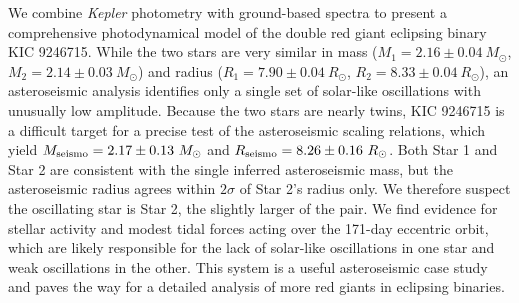 We combine \emph{Kepler} photometry with ground-based spectra to present a comprehensive photodynamical model of the double red giant eclipsing binary KIC 9246715. While the two stars are very similar in mass ($M_1 = 2.16 \pm 0.04\ M_{\odot}$, $M_2 = 2.14 \pm 0.03\ M_{\odot}$) and radius ($R_1 = 7.90 \pm 0.04 \ R_{\odot}$, $R_2 = 8.33 \pm 0.04 \ R_{\odot}$), an asteroseismic analysis identifies only a single set of solar-like oscillations with unusually low amplitude. Because the two stars are nearly twins, KIC 9246715 is a difficult target for a precise test of the asteroseismic scaling relations, which yield $M_{\rm{seismo}} = 2.17 \pm 0.13 \ M_{\odot}$ and $R_{\rm{seismo}} = 8.26 \pm 0.16 \ R_{\odot}$. Both Star 1 and Star 2 are consistent with the single inferred asteroseismic mass, but the asteroseismic radius agrees within $2 \sigma$ of Star 2's radius only. We therefore suspect the oscillating star is Star 2, the slightly larger of the pair. We find evidence for stellar activity and modest tidal forces acting over the 171-day eccentric orbit, which are likely responsible for the lack of solar-like oscillations in one star and weak oscillations in the other. This system is a useful asteroseismic case study and paves the way for a detailed analysis of more red giants in eclipsing binaries.
    
    
  
  
  
  
  